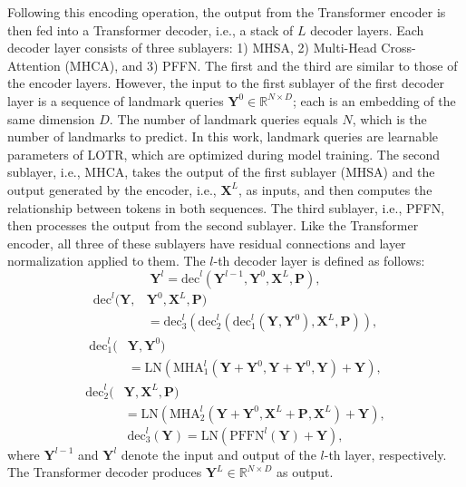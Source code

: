 \documentclass[journal]{IEEEtran}
\begin{document}
Following this encoding operation, the output from the Transformer encoder is then fed into a Transformer decoder, i.e., a stack of $L$ decoder layers. 
Each decoder layer consists of three sublayers: 1) MHSA, 2) Multi-Head Cross-Attention (MHCA), and 3) PFFN. 
The first and the third are similar to those of the encoder layers. 
However, the input to the first sublayer of the first decoder layer is a sequence of landmark queries $\mathbf{Y}^0 \in \mathbb{R}^{N \times D}$; each is an embedding of the same dimension $D$. 
The number of landmark queries equals $N$, which is the number of landmarks to predict. 
In this work, landmark queries are learnable parameters of LOTR, which are optimized during model training. 
The second sublayer, i.e., MHCA, takes the output of the first sublayer (MHSA) and the output generated by the encoder, i.e., $\mathbf{X}^L$, as inputs, and then computes the relationship between tokens in both sequences. 
The third sublayer, i.e., PFFN, then processes the output from the second sublayer.
Like the Transformer encoder, all three of these sublayers have residual connections and layer normalization applied to them. 
The $l$-th decoder layer is defined as follows:
\begin{equation}
     \mathbf{Y}^{l} = \text{dec}^l(\mathbf{Y}^{l-1}, \mathbf{Y}^0, \mathbf{X}^L, \mathbf{P}),
\end{equation}
\begin{equation}
\begin{split}
    \text{dec}^l(\mathbf{Y}, &\mathbf{Y}^0, \mathbf{X}^L, \mathbf{P}) \\
    &  = \text{dec}^l_3(\text{dec}^l_2(\text{dec}^l_1(\mathbf{Y}, \mathbf{Y}^0), \mathbf{X}^L, \mathbf{P})),
\end{split}
\end{equation}
\begin{equation}
\begin{split}
    \text{dec}^l_1(&\mathbf{Y}, \mathbf{Y}^0) \\ 
    & = \text{LN}(\text{MHA}^l_1(\mathbf{Y} + \mathbf{Y}^0, \mathbf{Y} + \mathbf{Y}^0, \mathbf{Y}) + \mathbf{Y}),
\end{split}
\end{equation}
\begin{equation}
\begin{split}
    \text{dec}^l_2(&\mathbf{Y}, \mathbf{X}^L, \mathbf{P}) \\ 
    & = \text{LN}(\text{MHA}^l_2(\mathbf{Y} + \mathbf{Y}^0, \mathbf{X}^L + \mathbf{P}, \mathbf{X}^L) + \mathbf{Y}),
\end{split}
\end{equation}
\begin{equation}
    \text{dec}^l_3(\mathbf{Y}) = \text{LN}(\text{PFFN}^l(\mathbf{Y}) + \mathbf{Y}),
\end{equation}
where $\mathbf{Y}^{l-1}$ and $\mathbf{Y}^{l}$ denote the input and output of the $l$-th layer, respectively.
The Transformer decoder produces $\mathbf{Y}^L \in \mathbb{R}^{N \times D}$ as output.
\end{document}
